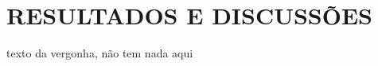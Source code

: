 %
%


\chapter{\textbf{RESULTADOS E DISCUSSÕES}}\label{chap:resultados}

texto da vergonha, não tem nada aqui
